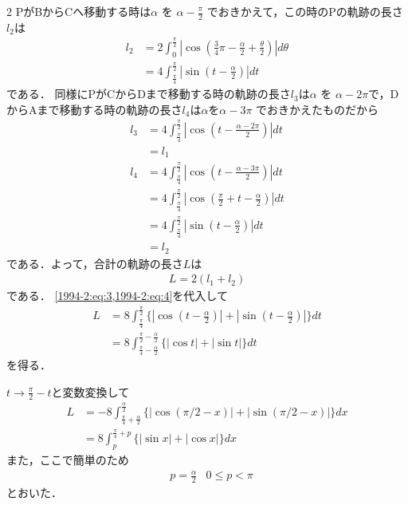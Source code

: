 \documentclass[../../../../main.tex]{subfiles}
\begin{document}
\begin{multicols}{2}
  PがBからCへ移動する時は$\alpha$ を $\alpha - \frac{\pi}{2}$ でおきかえて，この時のPの軌跡の長さ$l_2$は
  \begin{align}
    l_2
     & = 2 \int_{0}^{\frac{\pi}{2}} |\cos(\frac{3}{4}\pi - \frac{\alpha}{2} + \frac{\theta}{2})| d\theta \\
     & = 4 \int_{\frac{\pi}{4}}^{\frac{\pi}{2}} |\sin(t-\frac{\alpha}{2})| dt \label{1994-2:eq:4}
  \end{align}
  である．
  同様にPがCからDまで移動する時の軌跡の長さ$l_3$は$\alpha$ を $\alpha - 2\pi$で，DからAまで移動する時の軌跡の長さ$l_4$は$\alpha$を$\alpha - 3\pi$ でおきかえたものだから
  \begin{align*}
    l_3
     & =  4 \int_{\frac{\pi}{4}}^{\frac{\pi}{2}} |\cos(t-\frac{\alpha-2\pi}{2})| dt         \\
     & = l_1                                                                                \\
    l_4
     & = 4 \int_{\frac{\pi}{4}}^{\frac{\pi}{2}} |\cos(t-\frac{\alpha-3\pi}{2})| dt          \\
     & = 4 \int_{\frac{\pi}{4}}^{\frac{\pi}{2}} |\cos(\frac{\pi}{2}+t-\frac{\alpha}{2})| dt \\
     & = 4 \int_{\frac{\pi}{4}}^{\frac{\pi}{2}} |\sin(t-\frac{\alpha}{2})| dt               \\
     & = l_2
  \end{align*}
  である．よって，合計の軌跡の長さ$L$は
  \begin{align}
    L = 2(l_1+l_2) \label{1994-2:eq:5}
  \end{align}
  である．
  \cref{1994-2:eq:3,1994-2:eq:4}を代入して
  \begin{align*}
    L
     & = 8\int_{\frac{\pi}{4}}^{\frac{\pi}{2}} \{|\cos(t-\frac{\alpha}{2})| + |\sin(t-\frac{\alpha}{2})|\} dt \\
     & = 8\int_{\frac{\pi}{4}-\frac{\alpha}{2}}^{\frac{\pi}{2}-\frac{\alpha}{2}} \{|\cos t| + |\sin t |\} dt
  \end{align*}
  を得る．

  $t \to \frac{\pi}{2}-t$と変数変換して
  \begin{align*}
    L
     & = -8\int_{\frac{\pi}{4}+\frac{\alpha}{2}}^{\frac{\alpha}{2}} \{|\cos (\pi/2-x)| + |\sin (\pi/2-x) |\} dx \\
     & = 8\int_{p}^{\frac{\pi}{4}+p} \{|\sin x| + |\cos x|\} dx
  \end{align*}
  また，ここで簡単のため
  \begin{align*}
     & p = \frac{\alpha}{2} & 0 \le p < \pi
  \end{align*}
  とおいた．


\end{multicols}
\end{document}
